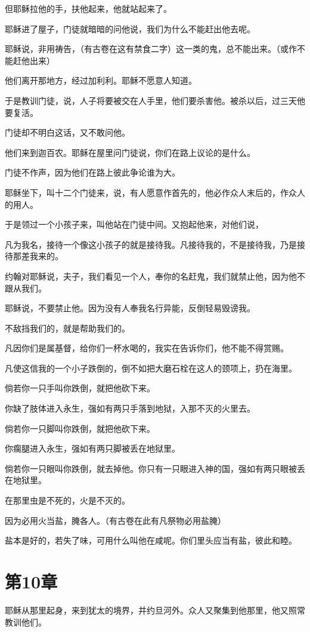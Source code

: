 \documentclass[12pt,oneside]{book}
\begin{document}
但耶稣拉他的手，扶他起来，他就站起来了。

耶稣进了屋子，门徒就暗暗的问他说，我们为什么不能赶出他去呢。

耶稣说，非用祷告，（有古卷在这有禁食二字）这一类的鬼，总不能出来。（或作不能赶他出来）

他们离开那地方，经过加利利。耶稣不愿意人知道。

于是教训门徒，说，人子将要被交在人手里，他们要杀害他。被杀以后，过三天他要复活。

门徒却不明白这话，又不敢问他。

他们来到迦百农。耶稣在屋里问门徒说，你们在路上议论的是什么。

门徒不作声，因为他们在路上彼此争论谁为大。

耶稣坐下，叫十二个门徒来，说，有人愿意作首先的，他必作众人末后的，作众人的用人。

于是领过一个小孩子来，叫他站在门徒中间。又抱起他来，对他们说，

凡为我名，接待一个像这小孩子的就是接待我。凡接待我的，不是接待我，乃是接待那差我来的。

约翰对耶稣说，夫子，我们看见一个人，奉你的名赶鬼，我们就禁止他，因为他不跟从我们。

耶稣说，不要禁止他。因为没有人奉我名行异能，反倒轻易毁谤我。

不敌挡我们的，就是帮助我们的。

凡因你们是属基督，给你们一杯水喝的，我实在告诉你们，他不能不得赏赐。

凡使这信我的一个小子跌倒的，倒不如把大磨石栓在这人的颈项上，扔在海里。

倘若你一只手叫你跌倒，就把他砍下来。

你缺了肢体进入永生，强如有两只手落到地狱，入那不灭的火里去。

倘若你一只脚叫你跌倒，就把他砍下来。

你瘸腿进入永生，强如有两只脚被丢在地狱里。

倘若你一只眼叫你跌倒，就去掉他。你只有一只眼进入神的国，强如有两只眼被丢在地狱里。

在那里虫是不死的，火是不灭的。

因为必用火当盐，腌各人。（有古卷在此有凡祭物必用盐腌）

盐本是好的，若失了味，可用什么叫他在咸呢。你们里头应当有盐，彼此和睦。

\chapter{第10章}
耶稣从那里起身，来到犹太的境界，并约旦河外。众人又聚集到他那里，他又照常教训他们。
\end{document}
